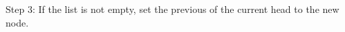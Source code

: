 \documentclass[preview]{standalone}
\begin{document}
Step 3: If the list is not empty, set the previous of the current head to the new node.\\
\end{document}

